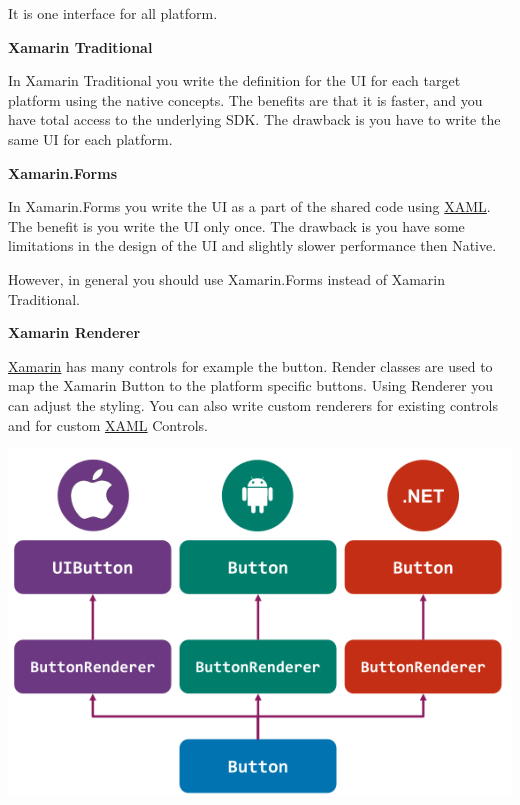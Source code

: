 \documentclass[10pt,twoside,landscape]{article}
\begin{document}
\begin{multicols}{4}
It is one interface for all platform.

\textbf{Xamarin Traditional}

In Xamarin Traditional you write the definition for the UI for each target platform using the native concepts.
The benefits are that it is faster, and you have total access to the underlying SDK.
The drawback is you have to write the same UI for each platform.

\textbf{Xamarin.Forms}

In Xamarin.Forms you write the UI as a part of the shared code using \href{../../../roam/20211123162058-xaml.org}{XAML}.
The benefit is you write the UI only once.
The drawback is you have some limitations in the design of the UI and slightly slower performance then Native.

However, in general you should use Xamarin.Forms instead of Xamarin Traditional.

\textbf{Xamarin Renderer}

\href{../../../roam/20220103094320-xamarin.org}{Xamarin} has many controls for example the button.
Render classes are used to map the Xamarin Button to the platform specific buttons.
Using Renderer you can adjust the styling.
You can also write custom renderers for existing controls and for custom \href{../../../roam/20211123162058-xaml.org}{XAML} Controls.


\begin{center}
\includegraphics[width=.9\linewidth]{img/xamarin_renderer.png}
\end{center}

\end{multicols}
\end{document}
